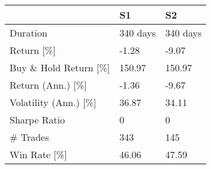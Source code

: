 \begin{tabular}{lll}
\toprule
 & S1 & S2 \\
\midrule
Duration & 340 days   & 340 days   \\
Return  [\%] & -1.28 & -9.07 \\
Buy \& Hold Return  [\%] & 150.97 & 150.97 \\
Return (Ann.)  [\%] & -1.36 & -9.67 \\
Volatility (Ann.)  [\%] & 36.87 & 34.11 \\
Sharpe Ratio & 0  & 0  \\
\# Trades & 343 & 145 \\
Win Rate  [\%] & 46.06 & 47.59 \\
\bottomrule
\end{tabular}
